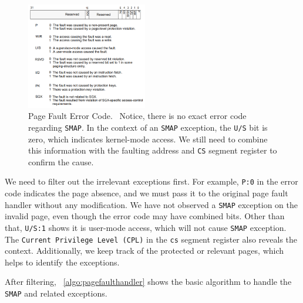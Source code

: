 \begin{figure}[th]
  \includegraphics[width=0.47\textwidth]{figures/pagefaulterrorcode}
  \centering
  \caption{Page Fault Error Code.~\cite{intelinterrupt} Notice, there is no exact error code regarding \texttt{SMAP}. In the context of an \texttt{SMAP} exception, the \texttt{U/S} bit is zero, which indicates kernel-mode access. We still need to combine this information with the faulting address and \texttt{CS} segment register to confirm the cause.}
  \label{fig:pagefaulterrorcode}
\end{figure}



We need to filter out the irrelevant exceptions first. For example, \texttt{P:0} in the error code indicates the page absence, and we must pass it to the original page fault handler without any modification. We have not observed a \texttt{SMAP} exception on the invalid page, even though the error code may have combined bits. Other than that, \texttt{U/S:1} shows it is user-mode access, which will not cause \texttt{SMAP} exception.  The \texttt{Current Privilege Level (CPL)} in the \texttt{cs} segment register also reveals the context. Additionally, we keep track of the protected or relevant pages, which helps to identify the exceptions.



After filtering, ~\autoref{algo:pagefaulthandler} shows the basic algorithm to handle the \texttt{SMAP} and related exceptions.


